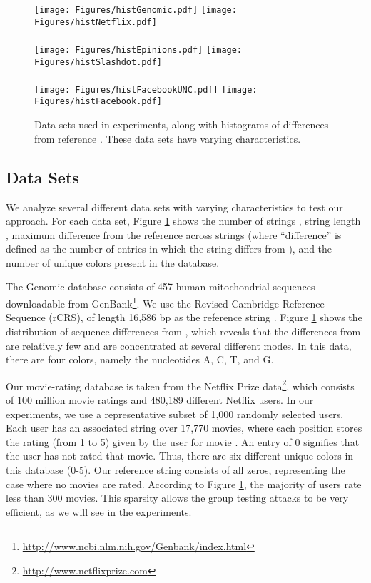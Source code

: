 \documentclass{article}
\begin{document}
\begin{figure}[hbt!]
\centering
\quad\texttt{[image: Figures/histGenomic.pdf]} \quad
\texttt{[image: Figures/histNetflix.pdf]} \\ \quad \\
\texttt{[image: Figures/histEpinions.pdf]} \qquad
\texttt{[image: Figures/histSlashdot.pdf]} \\ \quad \\
\texttt{[image: Figures/histFacebookUNC.pdf]} \quad
\texttt{[image: Figures/histFacebook.pdf]}
\caption{Data sets used in experiments, along with histograms of differences from reference .
These data sets have varying characteristics.}
\label{tbl:data}
\end{figure}


\subsection{Data Sets}

We analyze several different data sets with varying characteristics to test our approach.
For each data set, Figure \ref{tbl:data} shows the number of strings , string length , 
maximum difference  from the reference  across strings (where ``difference'' is 
defined as the number of entries in which the string differs from ), 
and the number of unique colors  present in the database.

The Genomic database consists of 457 human mitochondrial sequences 
downloadable from GenBank\footnote{\url{http://www.ncbi.nlm.nih.gov/Genbank/index.html}}.  
We use the Revised Cambridge Reference Sequence (rCRS), of length 16,586 bp 
as the reference string .  Figure \ref{tbl:data} shows the distribution of 
sequence differences from , which reveals that the differences from 
are relatively few and are concentrated at several different modes.  In this data,
there are four colors, namely the nucleotides A, C, T, and G.

Our movie-rating database is taken from the Netflix Prize
data\footnote{\url{http://www.netflixprize.com}}, 
which consists of 100 million movie ratings and 480,189 different Netflix 
users.  In our experiments, we use a representative subset of 1,000 randomly selected 
users.  Each user has an associated string over 17,770 movies, where each position 
 stores the rating (from 1 to 5) given by the user for movie .  An entry of 0
signifies that the user has not rated that movie.  Thus, there are six different unique
colors in this database (0-5).  Our reference string  consists of all zeros, 
representing the case where no movies are rated.  According to 
Figure \ref{tbl:data}, the majority of users rate less than 300 movies.  This 
sparsity allows the group testing attacks to be very efficient, as we will see in 
the experiments.
 
\end{document}

